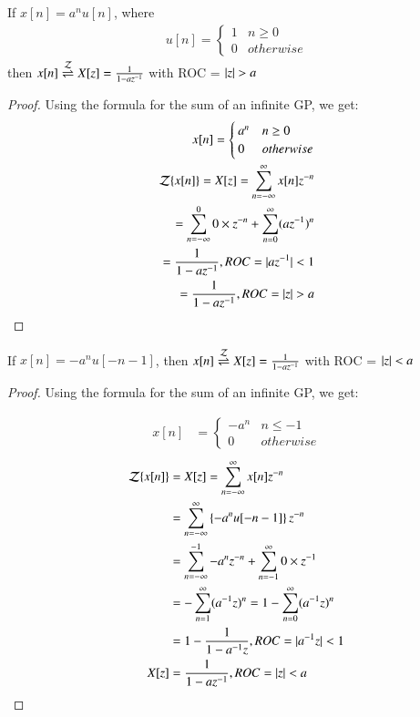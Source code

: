 \documentclass[journal,12pt,twocolumn]{IEEEtran}
\begin{document}
\begin{lemma}
If $x[n] = a^nu[n]$, where 
\begin{align}
    u[n] = 
    \begin{cases}
    1 & n \geq 0\\
    0 & otherwise
    \end{cases}
\end{align}
then $x[n] \overset{\mathcal{Z}}{ \rightleftharpoons} X[z] = \frac{1}{1 - az^{-1}}$ with ROC = $\vert z\vert>a$
\label{0}
\end{lemma}
\begin{proof}
Using the formula for the sum of an infinite GP, we get:
\begin{align}
    x[n] = 
    \begin{cases}
    a^n & n\geq 0\\
    0 & otherwise
    \end{cases}\\
    \mathcal{Z}\{x[n]\} = X[z] = \sum_{n = -\infty}^\infty x[n]z^{-n}\\
    = \sum_{n = -\infty}^0 0 \times z^{-n} + \sum_{n = 0}^{\infty} (az^{-1})^n\\
     = \frac{1}{1 - az^{-1}} , ROC = \vert az^{-1}\vert < 1\\
      = \frac{1}{1 - az^{-1}} , ROC =  \vert z\vert > a
\end{align}
\end{proof}
\begin{lemma}
If $x[n] = -a^nu[-n-1]$, then $x[n] \overset{\mathcal{Z}}{ \rightleftharpoons} X[z] = \frac{1}{1 - az^{-1}}$ with ROC = $\vert z\vert<a$ 
\label{1}
\end{lemma}
\begin{proof}
Using the formula for the sum of an infinite GP, we get:

\begin{align}
    x[n] &= 
    \begin{cases}
    -a^n & n\leq -1\\
    0 & otherwise
    \end{cases}
\end{align}
\begin{align}
   \nonumber \mathcal{Z}\{x[n]\} &= X[z] = \sum_{n = -\infty}^\infty x[n]z^{-n}\\
  \nonumber  &= \sum_{n = -\infty}^\infty \left\{-a^nu[-n-1]\right\}z^{-n}\\
  \nonumber    &= \sum_{n = -\infty}^{-1} {-a^n}z^{-n} + \sum_{n = -1}^{\infty} 0\times z^{-1}\\
  \nonumber  &=-\sum_{n = 1}^{\infty} (a^{-1}z)^n =1-\sum_{n = 0}^{\infty} (a^{-1}z)^n\\
  \nonumber   &= 1-\frac{1}{1 - a^{-1}z} , ROC = \vert a^{-1}z\vert < 1\\
     X[z] &= \frac{1}{1 - az^{-1}} , ROC =  \vert z\vert < a
\end{align}
\end{proof}
\end{document}
